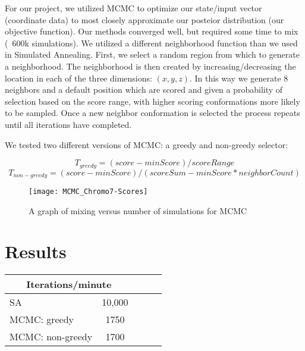 \documentclass{article}
\begin{document}
For our project, we utilized MCMC to optimize our state/input vector (coordinate data) to most closely approximate our posteior distribution (our objective function).  Our methods converged well, but required some time to mix (~600k simulations).  We utilized a different neighborhood function than we used in Simulated Annealing.  First, we select a random region from which to generate a neighborhood. The neighborhood is then created by increasing/decreasing the location in each of the three dimensions: $(x, y, z)$. In this way we generate 8 neighbors and a default position which are scored and given a probability of selection based on the score range, with higher scoring conformations more likely to be sampled. Once a new neighbor conformation is selected the process repeats until all iterations have completed.

We tested two different versions of MCMC: a greedy and non-greedy selector:

\begin{equation}
      T_{greedy} = (score - minScore) / scoreRange
    \end{equation}
\begin{equation}
      T_{non-greedy} = (score - minScore) / (scoreSum - minScore * neighborCount)
    \end{equation}

\begin{figure}[H]
\begin{center}
\texttt{[image: MCMC\_Chromo7-Scores]}
\caption{A graph of mixing versus number of simulations for MCMC}
\label{Fig:mcmc_mixing}
\end{center}
\end{figure}

\section{Results}


\begin{center}
\begin{tabular}{|l|c|c|c|r|}
\multicolumn{2}{c}{Iterations/minute} \\
    \hline
    SA & 10,000 \\ \hline
    MCMC: greedy & 1750    \\ \hline
    MCMC: non-greedy & 1700    \\ \hline
    \end{tabular}
\end{center}
\end{document}

